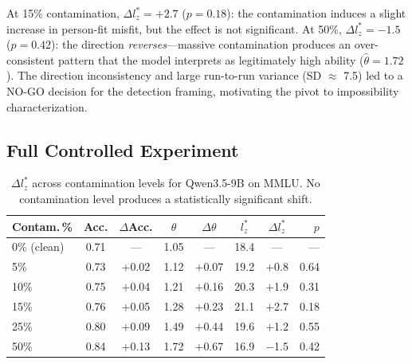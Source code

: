 \documentclass[11pt]{article}
\begin{document}
At 15\% contamination, $\Delta l_z^* = +2.7$ ($p = 0.18$): the contamination induces a slight increase in person-fit misfit, but the effect is not significant.
At 50\%, $\Delta l_z^* = -1.5$ ($p = 0.42$): the direction \emph{reverses}---massive contamination produces an over-consistent pattern that the model interprets as legitimately high ability ($\hat{\theta} = 1.72$).
The direction inconsistency and large run-to-run variance (SD $\approx$ 7.5) led to a NO-GO decision for the detection framing, motivating the pivot to impossibility characterization.

\subsection{Full Controlled Experiment}

\begin{table}[t]
\centering
\caption{$\Delta l_z^*$ across contamination levels for Qwen3.5-9B on MMLU. No contamination level produces a statistically significant shift.}
\label{tab:ctrl-qwen}
\begin{tabular}{lccccccr}
\toprule
Contam.\,\% & Acc. & $\Delta$Acc. & $\theta$ & $\Delta\theta$ & $l_z^*$ & $\Delta l_z^*$ & $p$ \\
\midrule
0\% (clean) & 0.71 & ---    & 1.05 & ---    & 18.4 & ---    & --- \\
5\%         & 0.73 & $+$0.02 & 1.12 & $+$0.07 & 19.2 & $+$0.8  & 0.64 \\
10\%        & 0.75 & $+$0.04 & 1.21 & $+$0.16 & 20.3 & $+$1.9  & 0.31 \\
15\%        & 0.76 & $+$0.05 & 1.28 & $+$0.23 & 21.1 & $+$2.7  & 0.18 \\
25\%        & 0.80 & $+$0.09 & 1.49 & $+$0.44 & 19.6 & $+$1.2  & 0.55 \\
50\%        & 0.84 & $+$0.13 & 1.72 & $+$0.67 & 16.9 & $-$1.5  & 0.42 \\
\bottomrule
\end{tabular}
\end{table}
\end{document}
